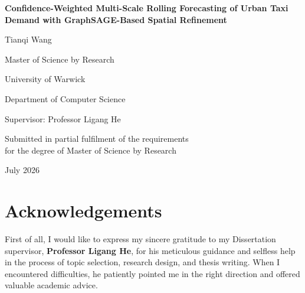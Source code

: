 \documentclass[12pt,a4paper]{report}
\begin{document}
	
	\begin{titlepage}
		\centering
		\vspace*{2cm}
		
		{\Huge\bfseries Confidence-Weighted Multi-Scale Rolling Forecasting of Urban Taxi Demand with GraphSAGE-Based Spatial Refinement\par}
		\vspace{1.5cm}
		
		{\Large Tianqi Wang\par}
		\vspace{0.5cm}
		{\large Master of Science by Research\par}
		\vspace{0.3cm}
		{\large University of Warwick\par}
		{\large Department of Computer Science\par}
		\vspace{1.5cm}
		
		{\large Supervisor: Professor Ligang He\par}
		\vfill
		
		{\large Submitted in partial fulfilment of the requirements\\
			for the degree of Master of Science by Research\par}
		
		\vspace{1cm}
		{\large July 2026\par}
	\end{titlepage}
	
	
	\tableofcontents
	\clearpage
	\listoffigures
	\clearpage
	\listoftables
	\clearpage

	\chapter*{Acknowledgements}
	First of all, I would like to express my sincere gratitude to my Dissertation supervisor,     
	\textbf{Professor Ligang He}, for his meticulous guidance and selfless help in the process of topic selection, research design, and thesis writing. When I encountered difficulties, he patiently pointed me in the right direction and offered valuable academic advice.
	
\end{document}
